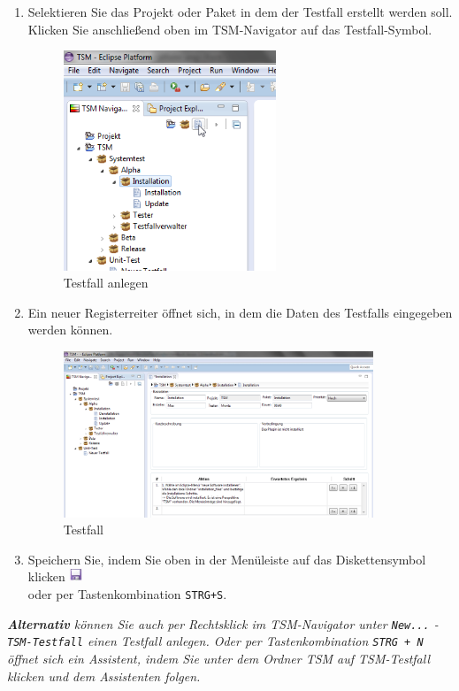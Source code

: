 \documentclass[11pt,a4paper,titlepage]{article}
\begin{document}
\begin{enumerate}
\item Selektieren Sie das Projekt oder Paket in dem der Testfall erstellt werden soll. Klicken Sie anschließend oben im TSM-Navigator auf das Testfall-Symbol.

\begin{figure}[H]
\centering
\includegraphics[width= 240px]{BilderHandbuchTSMNavigator/Testfall/Testfall.png}
\caption{Testfall anlegen}
\label{fig:Testfall}
\end{figure}

\item Ein neuer Registerreiter öffnet sich, in dem die Daten des Testfalls eingegeben werden können.

\begin{figure}[H]
\centering
\includegraphics[width= 350px]{BilderHandbuchTSMNavigator/Testfall/TestfallReiter.png}
\caption{Testfall}
\label{fig:TestfallReiter}
\end{figure}

\item Speichern Sie, indem Sie oben in der Menüleiste auf das
Diskettensymbol klicken
\includegraphics[width= 15px]{BilderHandbuch/Testfall/Disk.png}
\\ oder per Tastenkombination \texttt{STRG+S}.

\end{enumerate}
\textit{\textbf{Alternativ} können Sie auch per Rechtsklick im TSM-Navigator unter \texttt{New...} - \texttt{TSM-Testfall} einen Testfall anlegen.
Oder per Tastenkombination \texttt{STRG + N} öffnet sich ein Assistent, indem Sie unter dem Ordner TSM auf TSM-Testfall klicken und dem Assistenten folgen.}
\end{document}
